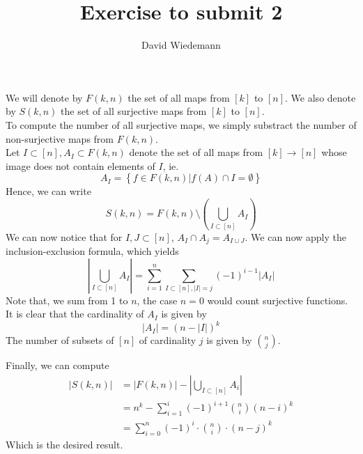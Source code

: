 \documentclass[11pt, a4paper, twoside]{article}
\begin{document}
\title{Exercise to submit 2}
\author{David Wiedemann}
\maketitle
We will denote by $F( k,n) $ the set of all maps from $[k]$ to $[n]$.
We also denote by $S( k,n) $ the set of all surjective maps from $[k] $ to $[ n] $.\\
To compute the number of all surjective maps, we simply substract the number of non-surjective maps from $F( k,n) $.\\
Let $I \subset [ n] ,A_I\subset F( k,n) $ denote the set of all maps from $[k] \to [ n] $ whose image does not contain elements of $I$, ie.
\[ 
	A_I = \left\{ f \in F( k,n) \big|  f( A) \cap I = \emptyset \right\} 
\]
Hence, we can write 
\[ 
	S( k,n)  = F( k,n) \setminus \left( \bigcup_{I\subset [ n] } A_{  I  }  \right) 
\]
We can now notice that for $I,J \subset [ n] $, $A_I \cap A_j= A_{I\cup J}$.
We can now apply the inclusion-exclusion formula, which yields
\[ 
	\left|\bigcup_{I \subset [ n] } A_{  I  }\right| = \sum_{i=1}^{ n} \sum_{ I \subset [ n], |I|=j } ( -1)^{i-1} |A_I|  
\]
Note that, we sum from 1 to $n$, the case $n=0$ would count surjective functions.\\
It is clear that the cardinality of $A_I$ is given by
\[ 
|A_I|= ( n - |I|)^{k}
\]
The number of subsets of $ [ n] $ of cardinality $j$ is given by $ \binom n j$.


Finally, we can compute
\begin{align*}
	|S( k,n) |&= |F( k,n) | - |\bigcup_{I\subset [ n] } A_{  i  } |\\
		  &= n^{k} - \sum_{i=1}^{ i}( -1) ^{i+1}\binom n i ( n-i)^{k}\\
		  &= \sum_{i=0}^{ n}( -1) ^{i} \cdot \binom n i \cdot ( n-j)^{k}
\end{align*}
Which is the desired result.
\end{document}
